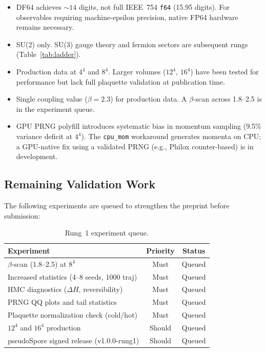 \documentclass[aps,prl,twocolumn,superscriptaddress,showpacs]{revtex4-2}
\begin{document}
\begin{itemize}
\item DF64 achieves ${\sim}14$ digits, not full IEEE~754 \texttt{f64}
  (15.95 digits). For observables requiring machine-epsilon precision,
  native FP64 hardware remains necessary.
\item SU(2) only. SU(3) gauge theory and fermion sectors are subsequent
  rungs (Table~\ref{tab:ladder}).
\item Production data at $4^4$ and $8^4$. Larger volumes ($12^4$,
  $16^4$) have been tested for performance but lack full plaquette
  validation at publication time.
\item Single coupling value ($\beta = 2.3$) for production data. A
  $\beta$-scan across 1.8--2.5 is in the experiment queue.
\item GPU PRNG polyfill introduces systematic bias in momentum sampling
  (9.5\% variance deficit at $4^4$). The \texttt{cpu\_mom} workaround
  generates momenta on CPU; a GPU-native fix using a validated PRNG
  (e.g., Philox counter-based) is in development.
\end{itemize}

\subsection{Remaining Validation Work}

The following experiments are queued to strengthen the preprint before
submission:

\begin{table}[h]
\caption{Rung~1 experiment queue.}
\label{tab:experiments}
\begin{ruledtabular}
\begin{tabular}{lcc}
Experiment & Priority & Status \\
\midrule
$\beta$-scan (1.8--2.5) at $8^4$ & Must & Queued \\
Increased statistics (4--8 seeds, 1000 traj) & Must & Queued \\
HMC diagnostics ($\Delta H$, reversibility) & Must & Queued \\
PRNG QQ plots and tail statistics & Must & Queued \\
Plaquette normalization check (cold/hot) & Must & Queued \\
$12^4$ and $16^4$ production & Should & Queued \\
pseudoSpore signed release (v1.0.0-rung1) & Should & Queued \\
\end{tabular}
\end{ruledtabular}
\end{table}
\end{document}

